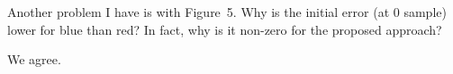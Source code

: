 \begin{reviewer}
Another problem I have is with Figure~5. Why is the initial error (at 0 sample)
lower for blue than red? In fact, why is it non-zero for the proposed approach?
\end{reviewer}

\begin{authors}
We agree.

\begin{actions}
\end{actions}
\end{authors}
